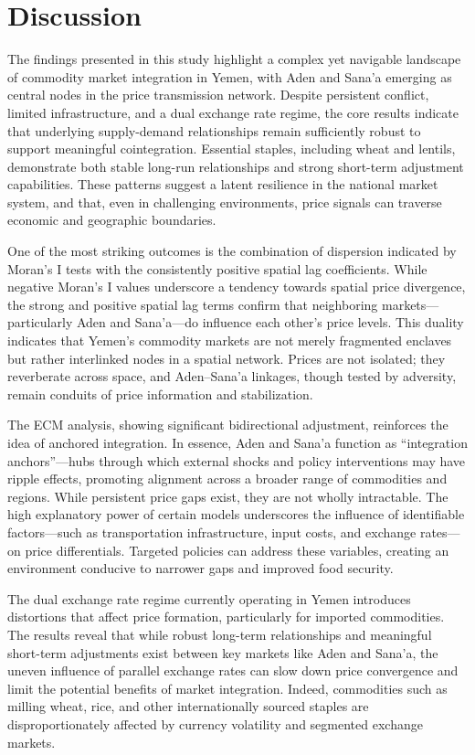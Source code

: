 \section{Discussion}
\small  %
\setlength{\parskip}{0.3em}  %

The findings presented in this study highlight a complex yet navigable landscape of commodity market integration in Yemen, with Aden and Sana'a emerging as central nodes in the price transmission network. Despite persistent conflict, limited infrastructure, and a dual exchange rate regime, the core results indicate that underlying supply-demand relationships remain sufficiently robust to support meaningful cointegration. Essential staples, including wheat and lentils, demonstrate both stable long-run relationships and strong short-term adjustment capabilities. These patterns suggest a latent resilience in the national market system, and that, even in challenging environments, price signals can traverse economic and geographic boundaries.

One of the most striking outcomes is the combination of dispersion indicated by Moran's I tests with the consistently positive spatial lag coefficients. While negative Moran's I values underscore a tendency towards spatial price divergence, the strong and positive spatial lag terms confirm that neighboring markets—particularly Aden and Sana'a—do influence each other's price levels. This duality indicates that Yemen's commodity markets are not merely fragmented enclaves but rather interlinked nodes in a spatial network. Prices are not isolated; they reverberate across space, and Aden–Sana'a linkages, though tested by adversity, remain conduits of price information and stabilization.

The ECM analysis, showing significant bidirectional adjustment, reinforces the idea of anchored integration. In essence, Aden and Sana'a function as ``integration anchors''—hubs through which external shocks and policy interventions may have ripple effects, promoting alignment across a broader range of commodities and regions. While persistent price gaps exist, they are not wholly intractable. The high explanatory power of certain models underscores the influence of identifiable factors—such as transportation infrastructure, input costs, and exchange rates—on price differentials. Targeted policies can address these variables, creating an environment conducive to narrower gaps and improved food security.

The dual exchange rate regime currently operating in Yemen introduces distortions that affect price formation, particularly for imported commodities. The results reveal that while robust long-term relationships and meaningful short-term adjustments exist between key markets like Aden and Sana'a, the uneven influence of parallel exchange rates can slow down price convergence and limit the potential benefits of market integration. Indeed, commodities such as milling wheat, rice, and other internationally sourced staples are disproportionately affected by currency volatility and segmented exchange markets.


